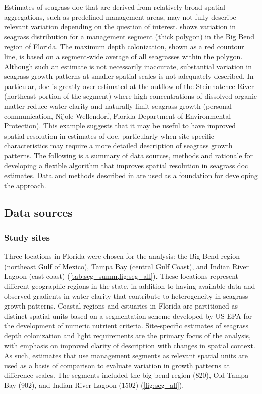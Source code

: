 \documentclass[letterpaper,12pt,oneside]{article}\usepackage[]{graphicx}\usepackage[]{color}
\begin{document}
Estimates of seagrass \ac{doc} that are derived from relatively broad spatial aggregations, such as predefined management areas, may not fully describe relevant variation depending on the question of interest.  shows variation in seagrass distribution for a management segment (thick polygon) in the Big Bend region of Florida.  The maximum depth colonization, shown as a red countour line, is based on a segment-wide average of all seagrasses within the polygon.  Although such an estimate is not necessarily inaccurate, substantial variation in seagrass growth patterns at smaller spatial scales is not adequately described. In particular, \ac{doc} is greatly over-estimated at the outflow of the Steinhatchee River (northeast portion of the segment) where high concentrations of dissolved organic matter reduce water clarity and naturally limit seagrass growth (personal communication, Nijole Wellendorf, Florida Department of Environmental Protection).  This example suggests that it may be useful to have improved spatial resolution in estimates of \ac{doc}, particularly when site-specific characteristics may require a more detailed description of seagrass growth patterns.  The following is a summary of data sources, methods and rationale for developing a flexible algorithm that improves spatial resolution in seagrass \ac{doc} estimates.  Data and methods described in  are used as a foundation for developing the approach.

\subsection{Data sources}

\subsubsection{Study sites}

Three locations in Florida were chosen for the analysis: the Big Bend region (northeast Gulf of Mexico), Tampa Bay (central Gulf Coast), and Indian River Lagoon (east coast) (\cref{tab:seg_summ,fig:seg_all}).  These locations represent different geographic regions in the state, in addition to having available data and observed gradients in water clarity that contribute to heterogeneity in seagrass growth patterns. Coastal regions and estuaries in Florida are partitioned as distinct spatial units based on a segmentation scheme developed by US \ac{EPA} for the development of numeric nutrient criteria.  Site-specific estimates of seagrass depth colonization and light requirements are the primary focus of the analysis, with emphasis on improved clarity of description with changes in spatial context.  As such, estimates that use management segments as relevant spatial units are used as a basis of comparison to evaluate variation in growth patterns at difference scales.  The segments included the big bend region (820), Old Tampa Bay (902), and Indian River Lagoon (1502) (\cref{fig:seg_all}).   
\end{document}
